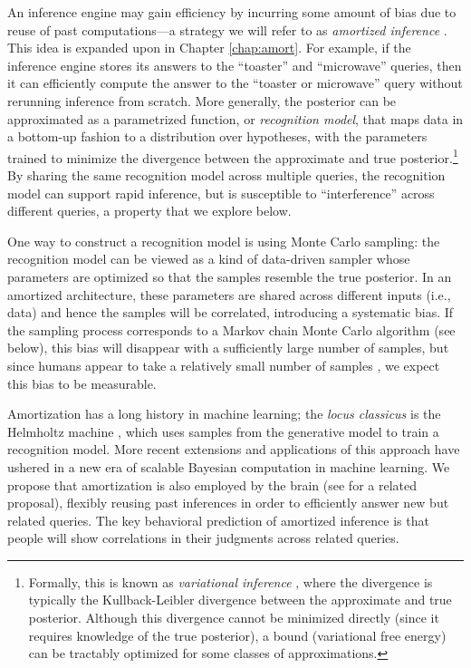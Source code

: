 An inference engine may gain efficiency by incurring some amount of bias due to reuse of past computations---a strategy we will refer to as \emph{amortized inference} \citep{stuhlmuller2013learning, gershman2014amortized}. This idea is expanded upon in Chapter \ref{chap:amort}. For example, if the inference engine stores its answers to the ``toaster'' and ``microwave'' queries, then it can efficiently compute the answer to the ``toaster or microwave'' query without rerunning inference from scratch. More generally, the posterior can be approximated as a parametrized function, or \emph{recognition model}, that maps data in a bottom-up fashion to a distribution over hypotheses, with the parameters trained to minimize the divergence between the approximate and true posterior.\footnote{Formally, this is known as \emph{variational inference} \citep{jordan1999introduction}, where the divergence is typically the Kullback-Leibler divergence between the approximate and true posterior. Although this divergence cannot be minimized directly (since it requires knowledge of the true posterior), a bound (variational free energy) can be tractably optimized for some classes of approximations.} By sharing the same recognition model across multiple queries, the recognition model can support rapid inference, but is susceptible to ``interference'' across different queries, a property that we explore below.

One way to construct a recognition model is using Monte Carlo sampling: the recognition model can be viewed as a kind of data-driven sampler whose parameters are optimized so that the samples resemble the true posterior. In an amortized architecture, these parameters are shared across different inputs (i.e., data) and hence the samples will be correlated, introducing a systematic bias. If the sampling process corresponds to a Markov chain Monte Carlo algorithm (see below), this bias will disappear with a sufficiently large number of samples, but since humans appear to take a relatively small number of samples \citep{dasgupta2017hypotheses,vul2014one}, we expect this bias to be measurable.

Amortization has a long history in machine learning; the \emph{locus classicus} is the Helmholtz machine \citep{dayan1995helmholtz,hinton1995wake}, which uses samples from the generative model to train a recognition model. More recent extensions and applications of this approach \citep{rezende2014stochastic,paige2016inference,kingma2013auto,ritchie2016neurally} have ushered in a new era of scalable Bayesian computation in machine learning. We propose that amortization is also employed by the brain (see \citet{yildirim2015efficient} for a related proposal), flexibly reusing past inferences in order to efficiently answer new but related queries. The key behavioral prediction of amortized inference is that people will show correlations in their judgments across related queries. 

